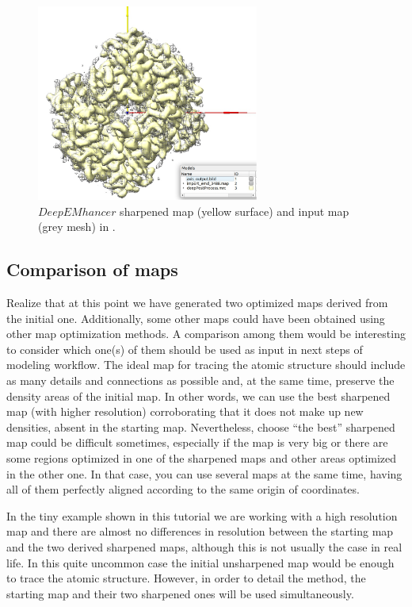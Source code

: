 \begin{figure}[H]
  \centering 
  \captionsetup{width=.7\linewidth} 
  \includegraphics[width=0.65\textwidth]
  {Images/Fig65}
  \caption{$DeepEMhancer$ sharpened map (yellow surface) and input map (grey mesh) in \chimera.}
  \label{fig:deepEMHancer_2}
  \end{figure}
  
\subsection*{Comparison of maps}
Realize that at this point we have generated two optimized maps derived from the initial one. Additionally, some other maps could have been obtained using other map optimization methods. A comparison among them would be interesting to consider which one(s) of them should be used as input in next steps of modeling workflow. The ideal map for tracing the atomic structure should include as many details and connections as possible and, at the same time, preserve the density areas of the initial map. In other words, we can use the best sharpened map (with higher resolution) corroborating that it does not make up new densities, absent in the starting map. Nevertheless, choose ``the best'' sharpened map could be difficult sometimes, especially if the map is very big or there are some regions optimized in one of the sharpened maps and other areas optimized in the other one. In that case, you can use several maps at the same time, having all of them perfectly aligned according to the same origin of coordinates.

In the tiny example shown in this tutorial we are working with a high resolution map and there are almost no differences in resolution between the starting map and the two derived sharpened maps, although this is not usually the case in real life. In this quite uncommon case the initial unsharpened map would be enough to trace the atomic structure. However, in order to detail the method, the starting map and their two sharpened ones will be used simultaneously.




